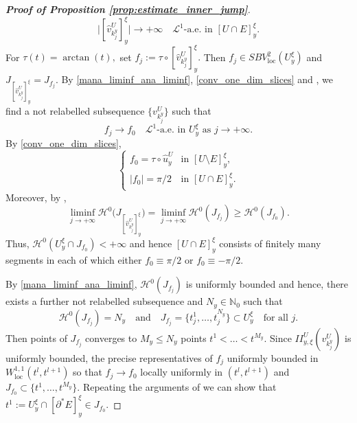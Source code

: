 \documentclass[reqno]{amsart}
\numberwithin{equation}{section}
\theoremstyle{plain}
\theoremstyle{definition}
\newcommand{\N}{\mathbb{N}}
\newcommand{\cH}{\mathcal{H}}
\newcommand{\cL}{\mathcal{L}}
\newcommand{\p}{\partial}
\renewcommand{\hat}{\widehat}
\newcommand{\loc}{\mathrm{loc}}
\begin{document}
\begin{proof}[\textbf{Proof of Proposition \ref{prop:estimate_inner_jump}}]
\begin{equation}
\Big|[\hat v_{k_j^y}^U]_y^\xi\Big| \to +\infty\quad\text{$\cL^1$-a.e.\  in $[U\cap E]_y^\xi.$}
\end{equation}
%
For $\tau(t)=\arctan(t),$ set $f_j:=\tau\circ [\hat v_{k_j^y}^U]_y^\xi.$ Then $f_j\in SBV_\loc^2(U_y^\xi)$ and $J_{[\hat v_{k_j^y}^U]_y^\xi}=J_{f_j}.$ By \eqref{mana_liminf_ana_liminf}, \eqref{conv_one_dim_slices}  and \cite[Proposition 4.2]{Ambrosio:1989}, we find a not relabelled  subsequence $\{v_{k_j^y}^U\}$ such that
\begin{equation*}
f_j\to f_0 \quad \text{$\cL^1$-a.e.\  in $U_y^\xi$ as $j\to+\infty.$}
\end{equation*}
%
 By \eqref{conv_one_dim_slices},
$$
\begin{cases}
f_0=\tau\circ \hat u_y^U  &  \text{in $[U\setminus E]_y^\xi,$}\\
|f_0| = \pi/2  &  \text{in $[U\cap E]_y^\xi.$}
\end{cases}
$$
Moreover, by \cite[Proposition 4.2]{Ambrosio:1989},
\begin{equation}
\liminf\limits_{j\to+\infty} \cH^0\Big(J_{[\hat v_{k_j^y}^U]_y^\xi}\Big) =
\liminf\limits_{j\to+\infty} \cH^0(J_{f_j}) \ge  \cH^0 (J_{f_0}).
\label{lsc_0_dimenaina}
\end{equation}
Thus, $\cH^0(U_y^\xi\cap J_{f_0} )<+\infty$ and hence  $[U\cap E]_y^\xi$ consists of finitely many segments in each of which either $f_0\equiv\pi/2$  or $f_0\equiv-\pi/2.$


By \eqref{mana_liminf_ana_liminf},
$\cH^0(J_{f_j})$ is uniformly bounded and hence, there exists a further not relabelled subsequence and $N_y \in\N_0$ such that 
\begin{equation*}
\cH^0(J_{f_j}) = N_y\quad\text{and}\quad J_{f_j} = \{t_j^1,\ldots,t_j^{N_y}\}\subset U_y^\xi\quad\text{for all $j.$} 
\end{equation*} 
Then points of $J_{f_j}$ converges to $M_y\le N_y$ points $t^1<\ldots<t^{M_y}.$ 
Since $II_{y,\xi}^U(v_{k_j^y}^U)$ is uniformly bounded, the precise representatives of $f_j$ uniformly bounded in $W_\loc^{1,1}(t^l,t^{l+1})$ so that $f_j\to f_0$ locally uniformly in $(t^l,t^{l+1})$ and $J_{f_0}\subset \{t^1,\ldots,t^{M_y}\}.$ Repeating the arguments of \cite[Section 1]{ChC:2020_jems} we can show that $t^1:=U_y^\xi\cap [\p^* E]_y^\xi \in J_{f_0}.$ 


\end{proof}
\end{document}
